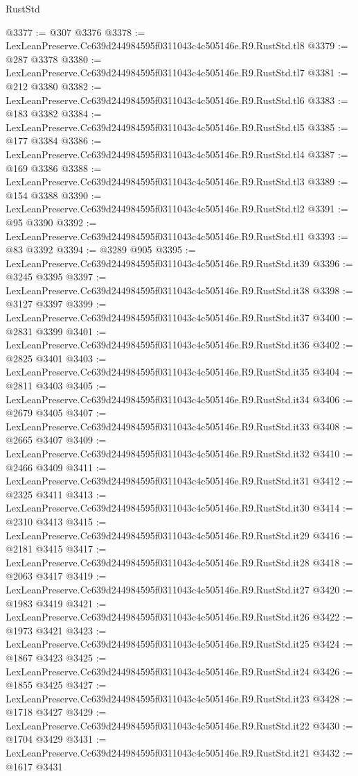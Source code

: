 \begin{lexlean}{RustStd}
\begin{coremodule}
@3377 := @307 @3376
@3378 := LexLeanPreserve.Cc639d244984595f0311043c4c505146e.R9.RustStd.tl8
@3379 := @287 @3378
@3380 := LexLeanPreserve.Cc639d244984595f0311043c4c505146e.R9.RustStd.tl7
@3381 := @212 @3380
@3382 := LexLeanPreserve.Cc639d244984595f0311043c4c505146e.R9.RustStd.tl6
@3383 := @183 @3382
@3384 := LexLeanPreserve.Cc639d244984595f0311043c4c505146e.R9.RustStd.tl5
@3385 := @177 @3384
@3386 := LexLeanPreserve.Cc639d244984595f0311043c4c505146e.R9.RustStd.tl4
@3387 := @169 @3386
@3388 := LexLeanPreserve.Cc639d244984595f0311043c4c505146e.R9.RustStd.tl3
@3389 := @154 @3388
@3390 := LexLeanPreserve.Cc639d244984595f0311043c4c505146e.R9.RustStd.tl2
@3391 := @95 @3390
@3392 := LexLeanPreserve.Cc639d244984595f0311043c4c505146e.R9.RustStd.tl1
@3393 := @83 @3392
@3394 := @3289 @905
@3395 := LexLeanPreserve.Cc639d244984595f0311043c4c505146e.R9.RustStd.it39
@3396 := @3245 @3395
@3397 := LexLeanPreserve.Cc639d244984595f0311043c4c505146e.R9.RustStd.it38
@3398 := @3127 @3397
@3399 := LexLeanPreserve.Cc639d244984595f0311043c4c505146e.R9.RustStd.it37
@3400 := @2831 @3399
@3401 := LexLeanPreserve.Cc639d244984595f0311043c4c505146e.R9.RustStd.it36
@3402 := @2825 @3401
@3403 := LexLeanPreserve.Cc639d244984595f0311043c4c505146e.R9.RustStd.it35
@3404 := @2811 @3403
@3405 := LexLeanPreserve.Cc639d244984595f0311043c4c505146e.R9.RustStd.it34
@3406 := @2679 @3405
@3407 := LexLeanPreserve.Cc639d244984595f0311043c4c505146e.R9.RustStd.it33
@3408 := @2665 @3407
@3409 := LexLeanPreserve.Cc639d244984595f0311043c4c505146e.R9.RustStd.it32
@3410 := @2466 @3409
@3411 := LexLeanPreserve.Cc639d244984595f0311043c4c505146e.R9.RustStd.it31
@3412 := @2325 @3411
@3413 := LexLeanPreserve.Cc639d244984595f0311043c4c505146e.R9.RustStd.it30
@3414 := @2310 @3413
@3415 := LexLeanPreserve.Cc639d244984595f0311043c4c505146e.R9.RustStd.it29
@3416 := @2181 @3415
@3417 := LexLeanPreserve.Cc639d244984595f0311043c4c505146e.R9.RustStd.it28
@3418 := @2063 @3417
@3419 := LexLeanPreserve.Cc639d244984595f0311043c4c505146e.R9.RustStd.it27
@3420 := @1983 @3419
@3421 := LexLeanPreserve.Cc639d244984595f0311043c4c505146e.R9.RustStd.it26
@3422 := @1973 @3421
@3423 := LexLeanPreserve.Cc639d244984595f0311043c4c505146e.R9.RustStd.it25
@3424 := @1867 @3423
@3425 := LexLeanPreserve.Cc639d244984595f0311043c4c505146e.R9.RustStd.it24
@3426 := @1855 @3425
@3427 := LexLeanPreserve.Cc639d244984595f0311043c4c505146e.R9.RustStd.it23
@3428 := @1718 @3427
@3429 := LexLeanPreserve.Cc639d244984595f0311043c4c505146e.R9.RustStd.it22
@3430 := @1704 @3429
@3431 := LexLeanPreserve.Cc639d244984595f0311043c4c505146e.R9.RustStd.it21
@3432 := @1617 @3431

\end{coremodule}
\end{lexlean}
